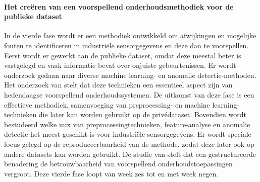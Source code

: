 
\paragraph{Het creëren van een voorspellend onderhoudsmethodiek voor de publieke dataset}

In de vierde fase wordt er een methodiek ontwikkeld om afwijkingen en mogelijke fouten te identificeren in industriële sensorgegevens en deze dan te voorspellen. Eerst wordt er gewerkt aan de publieke dataset, omdat deze meestal beter is vastgelegd en vaak informatie bevat over onjuiste gebeurtenissen. Er wordt onderzoek gedaan naar diverse machine learning- en anomalie detectie-methoden. Het onderzoek van \textcite{Carvalho2019} stelt dat deze technieken een essentieel aspect zijn van hedendaagse voorspellend onderhoudssystemen. De uitkomst van deze fase is een effectieve methodiek, samenvoeging van preprocessing- en machine learning-technieken die later kan worden gebruikt op de privédataset. Bovendien wordt bestudeerd welke mix van preprocessingtechnieken, feature-analyse en anomalie detectie het meest geschikt is voor industriële sensorgegevens. Er wordt speciale focus gelegd op de reproduceerbaarheid van de methode, zodat deze later ook op andere datasets kan worden gebruikt. De studie van \textcite{Li2025} stelt dat een gestructureerde benadering de betrouwbaarheid van voorspellend onderhoudstoepassingen vergroot. Deze vierde fase loopt van week zes tot en met week negen. 


